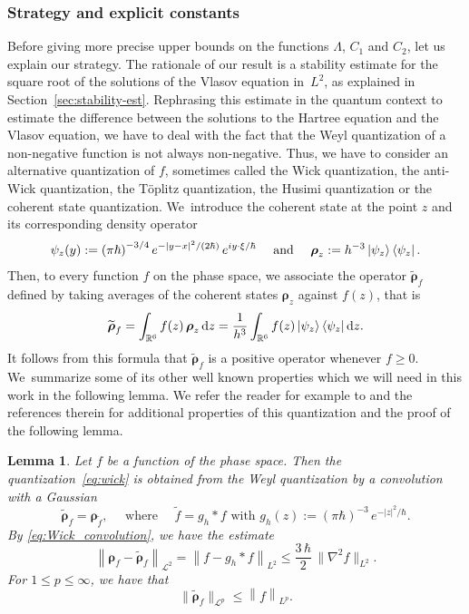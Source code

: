\documentclass[11pt]{article}
\newcommand {\aNrm}[2] {\lVert{#1}\rVert_{#2}}
\newtheorem{lem}{Lemma}[section]
\theoremstyle{definition}
\newcommand {\RR} {\mathbb R}
\newcommand {\RRd} {\RR^6}
\renewcommand {\L} {\mathcal L}
\let\lt\left
\let\rt\right
\renewcommand {\(} {\lt(}
\renewcommand {\)} {\rt)}
\newcommand {\n}[1] {\lt\lvert #1 \rt\rvert}
\newcommand {\nrm}[1] {\lt\lVert #1\rt\rVert}
\newcommand {\Nrm}[2] {\nrm{#1}_{#2}}
\renewcommand {\d} {\mathop{}\!\mathrm{d}}
\newcommand {\intdd} {\int_{\RRd}}
\newcommand {\op} {\boldsymbol{\rho}}
\begin{document}
\subsubsection{Strategy and explicit constants} Before giving more precise upper bounds on the functions $\Lambda$, $C_1$ and $C_2$, let us explain our strategy. The rationale of our result is a stability estimate for the square root of the solutions of the Vlasov equation in~$L^2$, as explained in Section~\ref{sec:stability-est}. Rephrasing this estimate in the quantum context to estimate the difference between the solutions to the Hartree equation and the Vlasov equation, we have to deal with the fact that the Weyl quantization of a non-negative function is not always non-negative. Thus, we have to consider an alternative quantization of $f$, sometimes called the Wick quantization, the anti-Wick quantization, the Töplitz quantization, the Husimi quantization or the coherent state quantization. We~introduce the coherent state at the point $z$ and its corresponding density operator
\begin{equation*}
\psi_z(y):= \(\pi \hbar\)^{-3/4} e^{-\n{y-x}^2/(2\hbar)}\,e^{i y\cdot \xi/\hbar} \quad \text{ and } \quad \op_z := h^{-3}\ket{\psi_z}\bra{\psi_z}.
\end{equation*}
Then, to every function $f$ on the phase space, we associate the operator $\widetilde{\op}_f$ defined by taking averages of the coherent states $\op_z$ against $f(z)$, that is
\begin{equation}\label{eq:wick}
\widetilde{\op}_f = \intdd f(z)\,\op_z\d z = \frac{1}{h^3}\intdd f(z) \ket{\psi_z}\bra{\psi_z}\d z.
\end{equation}
It follows from this formula that $\widetilde{\op}_f$ is a positive operator whenever $f\ge 0$. We~summarize some of its other well known properties which we will need in this work in the following lemma. We refer the reader for example to \cite{lions_sur_1993, lerner_fefferman-phong_2007} and the references therein for additional properties of this quantization and the proof of the following lemma.

\begin{lem}\label{lem:properties_of_Wick}
Let $f$ be a function of the phase space. Then the quantization~\eqref{eq:wick} is obtained from the Weyl quantization by a convolution with a Gaussian
\begin{equation}\label{eq:Wick_convolution}
\widetilde{\op}_f =\op_{\tilde f}, \quad \text{ where } \quad \widetilde f = g_h\ast f \text{ with } g_h(z):= (\pi\hbar)^{-3}\,e^{-\n{z}^2/\hbar}.
\end{equation}
By \eqref{eq:Wick_convolution}, we have the estimate
\begin{equation}\label{eq:Wick_Weyl_error}
\Nrm{\op_f-\widetilde{\op}_f}{\L^2} = \Nrm{f-g_h\ast f}{L^2} \le \frac{3\, \hbar}{2}\,\aNrm{\nabla^2 f}{L^2}.
\end{equation}
For $1\le p\le \infty$, we have that
\begin{equation}\label{eq:Wick_Schatten}
\aNrm{\widetilde{\op}_f}{\L^p}\le \Nrm{f}{L^p}.
\end{equation}
\end{lem}
\end{document}
